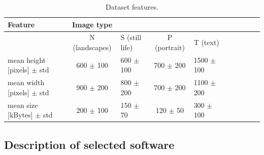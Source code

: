 \documentclass[11pt]{article}
\makeatletter
\newcommand{\subf}[2]{%
  {\small\begin{tabular}[t]{@{}c@{}}
  #1\\#2
  \end{tabular}}%
}
\makeatother
\begin{document}
\begin{table}[!h] 
\caption{Dataset features.}
\label{Tab:Features}
\begin{tabular}{lclclclclc}
\hline
\hline 
Feature &  Image type\\
\hline
\midrule
{}       & N (landscapes)   & S (still life)    & P (portrait)   & T (text)\\
mean height [pixels] $\pm$ std  &  600 $\pm$ 100 & 600 $\pm$ 100   & 700 $\pm$ 200  & 1500 $\pm$ 100 \\
mean width [pixels] $\pm$ std   &  900 $\pm$ 200 & 800 $\pm$ 200   & 700 $\pm$ 200  &  1100 $\pm $200 \\
mean size [kBytes] $\pm$ std    &  200 $\pm$ 100 & 150 $\pm$ 70    & 120 $\pm$ 50   &  300 $\pm$ 100\\
\hline
\end{tabular}
\end{table}

% 

\subsection{Description of selected software}
\end{document}
